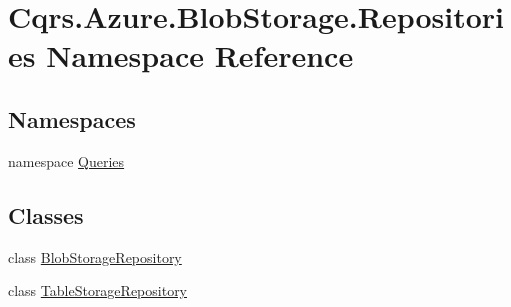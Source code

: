 \hypertarget{namespaceCqrs_1_1Azure_1_1BlobStorage_1_1Repositories}{}\section{Cqrs.\+Azure.\+Blob\+Storage.\+Repositories Namespace Reference}
\label{namespaceCqrs_1_1Azure_1_1BlobStorage_1_1Repositories}
\subsection*{Namespaces}
\begin{DoxyCompactItemize}
\item 
namespace \hyperlink{namespaceCqrs_1_1Azure_1_1BlobStorage_1_1Repositories_1_1Queries}{Queries}
\end{DoxyCompactItemize}
\subsection*{Classes}
\begin{DoxyCompactItemize}
\item 
class \hyperlink{classCqrs_1_1Azure_1_1BlobStorage_1_1Repositories_1_1BlobStorageRepository}{Blob\+Storage\+Repository}
\item 
class \hyperlink{classCqrs_1_1Azure_1_1BlobStorage_1_1Repositories_1_1TableStorageRepository}{Table\+Storage\+Repository}
\end{DoxyCompactItemize}
